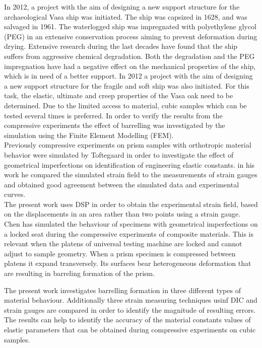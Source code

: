 \documentclass[review]{elsarticle}
\begin{document}
In 2012, a project with the aim of designing a new support structure for the
archaeological Vasa ship was initiated. The ship was capsized in 1628, and was salvaged in 1961. 
The waterlogged ship was impregnated with polyethylene glycol (PEG) in an extensive conservation process aiming to prevent deformation during drying. 
Extensive research during the last decades have found that the ship suffers from
aggressive chemical degradation. Both the degradation \cite{bjurhager2012state}
and the PEG impregnation \cite{ljungdahl2007transverse} have had a negative effect on the mechanical properties of the ship, which is in need of a better support. In 2012 a project with the aim of 
designing a new support structure for the fragile and soft ship was also initiated. For this task, the elastic, ultimate and creep properties of the 
Vasa oak need to be determined. Due to the limited access to material, cubic samples which can be tested several times is preferred.
In order to verify the results from the compressive experiments the effect of
barrelling was investigated by the simulation using the Finite Element
Modelling (FEM).\\
Previously compressive experiments on prism samples with orthotropic material
behavior were simulated by Toftegaard \cite{Toftegaard1999849} in order to
investigate the effect of geometrical imperfections on identification of
engineering elastic constants.
in his work he compared the simulated strain field to the measurements of strain
gauges and obtained good agreement between the simulated data and experimental
curves.\\
The present work uses DSP in order to obtain the experimental strain field,
based on the displacements in an area rather than two points using a strain
gauge.
Chen \cite{Chen001} has simulated the behaviour of specimens with geometrical
imperfections on a locked  seat during the compressive experiments
of composite materials. This is relevant when the platens of universal testing
machine are locked and cannot adjust to sample geometry.
When a prism specimen is compressed between platens it expand transversely.
Its surfaces bear heterogeneous deformation that are resulting in barreling
formation of the prism. 




The present work investigates
barrelling formation in three different types of material behaviour.
Additionally three strain measuring techniques usinf DIC and strain gauges are
compared in order to identify the magnitude of resulting errors.
The results can help to identify the accuracy of the material constants values
of elastic parameters that can be obtained during compressive experiments on
cubic samples.
\end{document}
